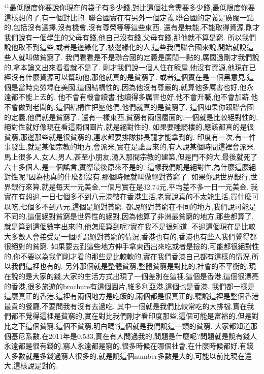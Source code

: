 \documentclass{book}
\begin{document}
$^{41}$最低限度你要說你現在的袋子有多少錢,對比這個社會需要多少錢,最低限度你要這樣想的了,有一個對比的.
聯合國實在有另外一個定義,聯合國的定義是廣闊一點的,包括沒有選擇,沒有機會,沒有尊榮等等這些東西.
還有是無能,不能取得資源,剛才我們說有一個學生的父母有錢,他自己沒有錢,父母有錢,那他就不算是窮.
所以我們說他取不到這些,或者是邊緣化了,被邊緣化的人,這些我們聯合國來說,開始就說這些人就叫做貧窮了.
我們看看是不是聯合國的定義是廣闊一點的,廣闊過剛才我們說的,拿本論文出來看看就不是了.
剛才我們說一個人住在籠屋,他沒有資源,他現在已經沒有什麼資源可以幫助他,那他就真的是貧窮了.
或者這個實在是一個黑意見,這個是當時克勞埠在美國,這個結構性的,因為他沒有尊嚴的,就算他多厲害也好,他永遠都不能上去的.
他不會有機會讀書,他讀得多厲害也好,他不會升職,他不會加薪,他不會做到老闆的,這個結構性把壓他們,他們就真的是貧窮了.
這個如果你跟聯合國的定義,他們就是貧窮了.
還有一樣東西,貧窮有兩個層面的,一個就是比較絕對性的,絕對性就好像現在看這兩個圖片,就是絕對性的.
如果要睡騎樓的,應該都真的是很貧窮,那邊那些就是很貧窮的,連水都要排隊排長龍才能拿到的.
印度有一次,有一件事發生,就是某個宗教的地方,會派米,實在是謠言來的,有人說某個時間這裡會派米.
馬上很多人,女人,男人,甚至小朋友,湧入那間宗教的建築,但是門不夠大,最後就死了六十多個人,是一個謠言,實際最後原來不是的.
這樣我們說是絕對性,為什麼這麼絕對性呢?因為他真的什麼都沒有,那個時候就叫做絕對貧窮了.
如果你說世界銀行,世界銀行來算,就是每天一元美金,一個月實在是32.74元,平均差不多一日一元美金.
我實在有想過,一日七個多不到八元港幣在香港生活,老實說真的不太能生活,買什麼可以吃,七個多不到八元,這個是絕對貧窮.
都說絕對貧窮在不同的地方,我們說可能是不同的,這個絕對貧窮是世界性的絕對,因為他算了非洲最貧窮的地方,那些都算了,就是算到這個數字出來的,他怎麼算到呢?實在我不是很知道.
不過這個現在是比較大多數人會接受是一個所謂絕對貧窮的情況,香港也有的,香港也有些人我們覺得都很絕對的貧窮.
如果要去到這些地方伸手拿東西出來吃或者是撿的,可能都很絕對性的,你不要以為我們剛才看的那些是比較軟的,實在我們香港自己都有這樣的情況,所以我們這裡也有的.
另外那個就是整體貧窮,整體貧窮是對比的,社會的不平衡的,現在說的是大家的錢,大家的生活方式出現了一個差別在這裡,這個是香港,這個很漂亮的香港,很多旅遊的brochure有這個圖片,維多利亞港,這個也是香港.
我們都一樣是這麼真正的香港,這裡有兩個地方是吃飯的,兩個都是很真正的,聽說這裡是整個香港最貴的餐廳,不要問我有沒有去過吃.
其中一個就是我們比較常吃的大排檔,實在我們都不覺得這裡是貧窮的,實在對比我們剛才看印度那些,這個可能是富裕的,但是對比之下這個貧窮,這個不貧窮,明白嗎?這個就是我們說這一類的貧窮.
大家都知道那個基尼系數,在2011年是0.533,實在有人問過我的,問題是什麼呢?問題就是說有錢人永遠都是很有錢的,窮人永遠都是窮的,很多時候在哪個社會,在什麼時候都好,有錢人多數就是多錢過窮人很多的,就是說這個number多數是大的,可能以前比現在還大,這樣說是對的.
\end{document}
